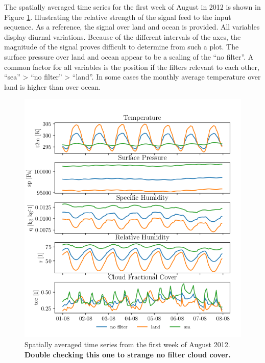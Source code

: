 The spatially averaged time series for the first week of August in 2012 is shown in Figure \ref{fig:first_week_august_2012}. Illustrating the relative strength of the signal feed to the input sequence. As a reference, the signal over land and ocean is provided. All variables display diurnal variations. Because of the different intervals of the axes, the magnitude of the signal proves difficult to determine from such a plot. The surface pressure over land and ocean appear to be a scaling of the ``no filter''. A common factor for all variables is the position if the filters relevant to each other, ``sea'' > ``no filter'' > ``land''. In some cases the monthly average temperature over land is higher than over ocean.
\begin{figure}[ht]
    \centering
    \includegraphics{python_figs/spatially_averaged_one_week_from_2012-08-01.png}
    \caption{Spatially averaged time series from the first week of August 2012. \textbf{Double checking this one to strange no filter cloud cover.}}
    \label{fig:first_week_august_2012}
\end{figure}


